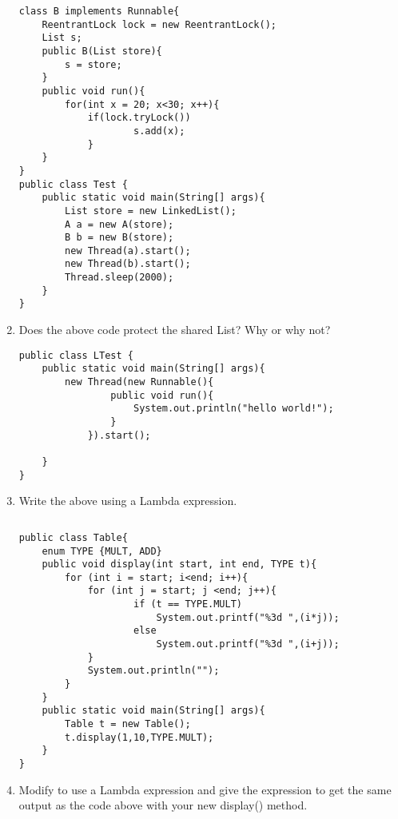 \documentclass{article}
\begin{document}
\begin{enumerate}
\begin{lstlisting}
class B implements Runnable{
 	ReentrantLock lock = new ReentrantLock();
 	List s;
 	public B(List store){
 		s = store;
 	}
 	public void run(){
  		for(int x = 20; x<30; x++){
   			if(lock.tryLock())
    				s.add(x);
    		}
 	}
}
public class Test {
 	public static void main(String[] args){
  		List store = new LinkedList();
  		A a = new A(store);
  		B b = new B(store);
  		new Thread(a).start();
  		new Thread(b).start();
  		Thread.sleep(2000);
 	}
}
\end{lstlisting}
	\item Does the above code protect the shared List? Why or why not?\newline
	\newpage
\begin{lstlisting}
public class LTest {
 	public static void main(String[] args){
  		new Thread(new Runnable(){
     			public void run(){
      				System.out.println("hello world!");
     			}
     		}).start();
 
 	}
}
\end{lstlisting}
	\item Write the above using a Lambda expression.
\begin{lstlisting}

\end{lstlisting}	
\newpage
\begin{lstlisting}
public class Table{
 	enum TYPE {MULT, ADD}
 	public void display(int start, int end, TYPE t){
  		for (int i = start; i<end; i++){
   			for (int j = start; j <end; j++){
    				if (t == TYPE.MULT)
     					System.out.printf("%3d ",(i*j));
    				else 
     					System.out.printf("%3d ",(i+j));
   			}
   			System.out.println("");
  		}
 	}
 	public static void main(String[] args){
  		Table t = new Table();
  		t.display(1,10,TYPE.MULT);
 	}
}
\end{lstlisting}
	\item Modify to use a Lambda expression and give the expression to get the same output as the code above with your new display() method.
\begin{lstlisting}
\end{lstlisting}
\end{enumerate}
\end{document}
